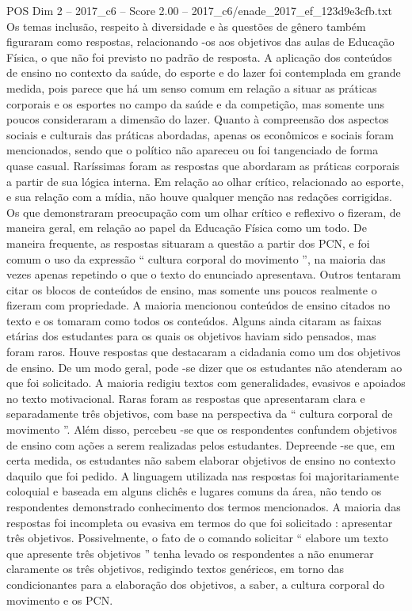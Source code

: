 \begin{textsample}{POS Dim 2 – 2017\_c6 – Score 2.00 – 2017\_c6/enade\_2017\_ef\_123d9e3cfb.txt}
Os temas inclusão, respeito à diversidade e às questões de gênero também figuraram como respostas, relacionando -os aos objetivos das aulas de Educação Física, o que não foi previsto no padrão de resposta.
A aplicação dos conteúdos de ensino no contexto da saúde, do esporte e do lazer foi contemplada em grande medida, pois parece que há um senso comum em relação a situar as práticas corporais e os esportes no campo da saúde e da competição, mas somente uns poucos consideraram a dimensão do lazer.
Quanto à compreensão dos aspectos sociais e culturais das práticas abordadas, apenas os econômicos e sociais foram mencionados, sendo que o político não apareceu ou foi tangenciado de forma quase casual.
Raríssimas foram as respostas que abordaram as práticas corporais a partir de sua lógica interna.
Em relação ao olhar crítico, relacionado ao esporte, e sua relação com a mídia, não houve qualquer menção nas redações corrigidas.
Os que demonstraram preocupação com um olhar crítico e reflexivo o fizeram, de maneira geral, em relação ao papel da Educação Física como um todo.
De maneira frequente, as respostas situaram a questão a partir dos PCN, e foi comum o uso da expressão “ cultura corporal do movimento ”, na maioria das vezes apenas repetindo o que o texto do enunciado apresentava.
Outros tentaram citar os blocos de conteúdos de ensino, mas somente uns poucos realmente o fizeram com propriedade.
A maioria mencionou conteúdos de ensino citados no texto e os tomaram como todos os conteúdos.
Alguns ainda citaram as faixas etárias dos estudantes para os quais os objetivos haviam sido pensados, mas foram raros.
Houve respostas que destacaram a cidadania como um dos objetivos de ensino.
De um modo geral, pode -se dizer que os estudantes não atenderam ao que foi solicitado.
A maioria redigiu textos com generalidades, evasivos e apoiados no texto motivacional.
Raras foram as respostas que apresentaram clara e separadamente três objetivos, com base na perspectiva da “ cultura corporal de movimento ”.
Além disso, percebeu -se que os respondentes confundem objetivos de ensino com ações a serem realizadas pelos estudantes.
Depreende -se que, em certa medida, os estudantes não sabem elaborar objetivos de ensino no contexto daquilo que foi pedido.
A linguagem utilizada nas respostas foi majoritariamente coloquial e baseada em alguns clichês e lugares comuns da área, não tendo os respondentes demonstrado conhecimento dos termos mencionados.
A maioria das respostas foi incompleta ou evasiva em termos do que foi solicitado : apresentar três objetivos.
Possivelmente, o fato de o comando solicitar “ elabore um texto que apresente três objetivos ” tenha levado os respondentes a não enumerar claramente os três objetivos, redigindo textos genéricos, em torno das condicionantes para a elaboração dos objetivos, a saber, a cultura corporal do movimento e os PCN.

\end{textsample}
